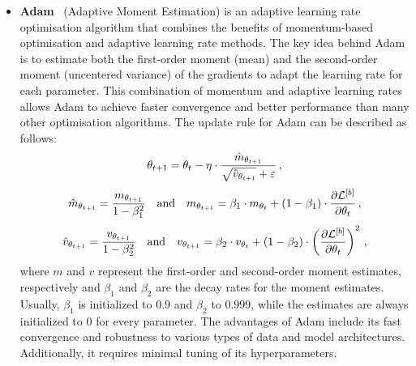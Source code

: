\begin{itemize}[leftmargin=1.5em]
    \item\textbf{Adam}~\supercite{adam} (Adaptive Moment Estimation) is an adaptive learning rate optimisation algorithm that combines the benefits of momentum-based optimisation and adaptive learning rate methods. The key idea behind Adam is to estimate both the first-order moment (mean) and the second-order moment (uncentered variance) of the gradients to adapt the learning rate for each parameter. This combination of momentum and adaptive learning rates allows Adam to achieve faster convergence and better performance than many other optimisation algorithms. The update rule for Adam can be described as follows:
    \begin{equation}
        \theta_{t+1} = \theta_{t} - \eta\cdot \dfrac{\hat{m}_{\theta_{t+1}}}{\sqrt{\hat{v}_{\theta_{t+1}}} + \varepsilon}\,,
    \end{equation}
    \begin{equation}
        \hat{m}_{\theta_{t+1}} = \dfrac{m_{\theta_{t+1}}}{1 - \beta_1^2} \quad \text{and} \quad m_{\theta_{t+1}} = \beta_1 \cdot m_{\theta_{t}} + (1 - \beta_1) \cdot \dfrac{\partial \mathcal{L}^{[b]}}{\partial \theta_{t}}\,,
    \end{equation}
    \begin{equation}
        \hat{v}_{\theta_{t+1}} = \dfrac{v_{\theta_{t+1}}}{1 - \beta_2^2} \quad \text{and} \quad v_{\theta_{t+1}} = \beta_2 \cdot v_{\theta_{t}} + (1 - \beta_2) \cdot \left( \dfrac{\partial \mathcal{L}^{[b]}}{\partial \theta_{t}} \right) ^ 2\,,
    \end{equation}
    where $m$ and $v$ represent the first-order and second-order moment estimates, respectively and $\beta_1$ and $\beta_2$ are the decay rates for the moment estimates. Usually, $\beta_1$ is initialized to $0.9$ and $\beta_2$ to $0.999$, while the estimates are always initialized to $0$ for every parameter. The advantages of Adam include its fast convergence and robustness to various types of data and model architectures. Additionally, it requires minimal tuning of its hyperparameters.


\end{itemize}
